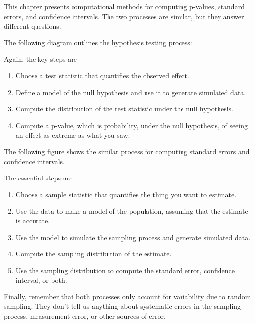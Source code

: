 This chapter presents computational methods for computing p-values,
standard errors, and confidence intervals. The two processes are
similar, but they answer different questions.

The following diagram outlines the hypothesis testing process:

Again, the key steps are

\begin{enumerate}
\def\labelenumi{\arabic{enumi}.}
\item
  Choose a test statistic that quantifies the observed effect.
\item
  Define a model of the null hypothesis and use it to generate simulated
  data.
\item
  Compute the distribution of the test statistic under the null
  hypothesis.
\item
  Compute a p-value, which is probability, under the null hypothesis, of
  seeing an effect as extreme as what you saw.
\end{enumerate}

The following figure shows the similar process for computing standard
errors and confidence intervals.

The essential steps are:

\begin{enumerate}
\def\labelenumi{\arabic{enumi}.}
\item
  Choose a sample statistic that quantifies the thing you want to
  estimate.
\item
  Use the data to make a model of the population, assuming that the
  estimate is accurate.
\item
  Use the model to simulate the sampling process and generate simulated
  data.
\item
  Compute the sampling distribution of the estimate.
\item
  Use the sampling distribution to compute the standard error,
  confidence interval, or both.
\end{enumerate}

Finally, remember that both processes only account for variability due
to random sampling. They don't tell us anything about systematic errors
in the sampling process, measurement error, or other sources of error.

